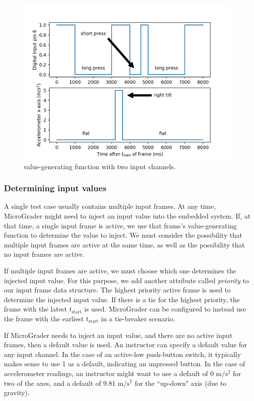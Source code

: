 \documentclass[12pt]{article}
\begin{document}
\begin{figure}[h]
\centering
\includegraphics[scale=1]{wiki-frame.png}
\vspace{5mm}
\caption{value-generating function with two input channels.}
\label{fig:value-gen}
\end{figure}

\subsubsection{Determining input values}
A single test case usually contains multiple input frames.  At any time, MicroGrader might need to inject an input value into the embedded system.  If, at that time, a single input frame is active, we use that frame's value-generating function to determine the value to inject.  We must consider the possibility that multiple input frames are active at the same time, as well as the possibility that no input frames are active.

If multiple input frames are active, we must choose which one determines the injected input value.  For this purpose, we add another attribute called \textit{priority} to our input frame data structure.  The highest priority active frame is used to determine the injected input value.  If there is a tie for the highest priority, the frame with the latest $t_{\text{start}}$ is used.  MicroGrader can be configured to instead use the frame with the earliest $t_{\text{start}}$ in a tie-breaker scenario.

If MicroGrader needs to inject an input value, and there are no active input frames, then a default value is used.  An instructor can specify a default value for any input channel.  In the case of an active-low push-button switch, it typically makes sense to use 1 as a default, indicating an unpressed button.  In the case of accelerometer readings, an instructor might want to use a default of 0 $\text{m}/\text{s}^2$ for two of the axes, and a default of 9.81 $\text{m}/\text{s}^2$ for the ``up-down" axis (due to gravity).
\end{document}
